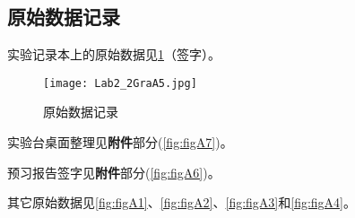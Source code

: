 \documentclass[dvipsnames, svgnames,a4paper,11pt]{article}
\begin{document}
	
	\clearpage
	\subsection{原始数据记录}
	实验记录本上的原始数据见\cref{fig:figA5}（签字）。
	
	\begin{figure}[htbp]
		\centering
		\texttt{[image: Lab2\_2GraA5.jpg]}
		\caption{原始数据记录}
		\label{fig:figA5}
	\end{figure}
	
	实验台桌面整理见\textbf{附件}部分(\cref{fig:figA7})。
	
	预习报告签字见\textbf{附件}部分(\cref{fig:figA6})。
	
	其它原始数据见\cref{fig:figA1}、\cref{fig:figA2}、\cref{fig:figA3}和\cref{fig:figA4}。
	
\end{document}
